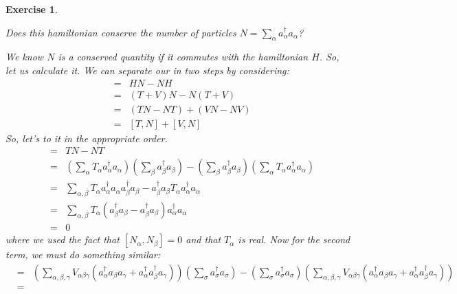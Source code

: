 \documentclass[12pt]{article}
\def\bea{\begin{eqnarray*}}
\def\eea{\end{eqnarray*}}
\def\l{\left}
\def\r{\right}
\newtheorem{exercise}{Exercise}
\begin{document}
\begin{exercise}
\begin{exercises}
			\item Does this hamiltonian conserve the number of particles $N=\sum_\alpha a^\dagger_\alpha a_\alpha$?
			\begin{multianswer}[true]
				We know $N$ is a conserved quantity if it commutes with the hamiltonian $H$. So, let us calculate it. We can separate our in two steps by considering:
				\bea
					[H, N] &=& HN - NH \\
						&=& (T+V)N - N(T+V) \\
						&=& (TN - NT) + (VN - NV) \\
						&=& [T, N] + [V, N]
				\eea
				So, let's to it in the appropriate order.
				\bea
					[T, N] &=& TN - NT \\
						&=& \l(\sum_\alpha T_\alpha a^\dagger_\alpha a_\alpha \r) \l( \sum_\beta a^\dagger_\beta a_\beta \r) - \l( \sum_\beta a^\dagger_\beta a_\beta \r)\l(\sum_\alpha T_\alpha a^\dagger_\alpha a_\alpha \r) \\
						&=& \sum_{\alpha, \beta} T_\alpha a^\dagger_\alpha a_\alpha a^\dagger_\beta a_\beta - a^\dagger_\beta a_\beta T_\alpha a^\dagger_\alpha a_\alpha \\
						&=& \sum_{\alpha, \beta} T_\alpha( a^\dagger_\beta a_\beta - a^\dagger_\beta a_\beta )a^\dagger_\alpha a_\alpha \\
						&=& 0
				\eea
				where we used the fact that $[N_\alpha, N_\beta] = 0$ and that $T_\alpha$ is real. Now for the second term, we must do something similar:
				\bea
					[V, N] &=& \l(\sum_{\alpha, \beta, \gamma} V_{\alpha\beta\gamma}\l( a^\dagger_\alpha a_\beta a_\gamma + a^\dagger_\alpha a^\dagger_\beta a_\gamma \r)\r) \l( \sum_\sigma a^\dagger_\sigma a_\sigma \r) - \l( \sum_\sigma a^\dagger_\sigma a_\sigma \r) \l(\sum_{\alpha, \beta, \gamma} V_{\alpha\beta\gamma}\l( a^\dagger_\alpha a_\beta a_\gamma + a^\dagger_\alpha a^\dagger_\beta a_\gamma \r)\r) \\
					&=& 
				\eea 
			\end{multianswer}
			
		\end{exercises}		
	\end{exercise}
	
	
\end{document}
